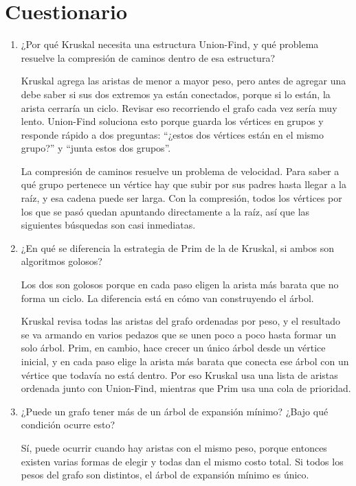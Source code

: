 \documentclass{article}
\begin{document}
\section{Cuestionario}

\begin{enumerate}
	\item ¿Por qué Kruskal necesita una estructura Union-Find, y qué problema resuelve la compresión de caminos dentro de esa estructura?

	Kruskal agrega las aristas de menor a mayor peso, pero antes de agregar una debe saber si sus dos extremos ya están conectados, porque si lo están, la arista cerraría un ciclo. Revisar eso recorriendo el grafo cada vez sería muy lento. Union-Find soluciona esto porque guarda los vértices en grupos y responde rápido a dos preguntas: ``¿estos dos vértices están en el mismo grupo?'' y ``junta estos dos grupos''.

	La compresión de caminos resuelve un problema de velocidad. Para saber a qué grupo pertenece un vértice hay que subir por sus padres hasta llegar a la raíz, y esa cadena puede ser larga. Con la compresión, todos los vértices por los que se pasó quedan apuntando directamente a la raíz, así que las siguientes búsquedas son casi inmediatas.

	\item ¿En qué se diferencia la estrategia de Prim de la de Kruskal, si ambos son algoritmos golosos?

	Los dos son golosos porque en cada paso eligen la arista más barata que no forma un ciclo. La diferencia está en cómo van construyendo el árbol.

	Kruskal revisa todas las aristas del grafo ordenadas por peso, y el resultado se va armando en varios pedazos que se unen poco a poco hasta formar un solo árbol. Prim, en cambio, hace crecer un único árbol desde un vértice inicial, y en cada paso elige la arista más barata que conecta ese árbol con un vértice que todavía no está dentro. Por eso Kruskal usa una lista de aristas ordenada junto con Union-Find, mientras que Prim usa una cola de prioridad.

	\item ¿Puede un grafo tener más de un árbol de expansión mínimo? ¿Bajo qué condición ocurre esto?

	Sí, puede ocurrir cuando hay aristas con el mismo peso, porque entonces existen varias formas de elegir y todas dan el mismo costo total. Si todos los pesos del grafo son distintos, el árbol de expansión mínimo es único.


\end{enumerate}
\end{document}
